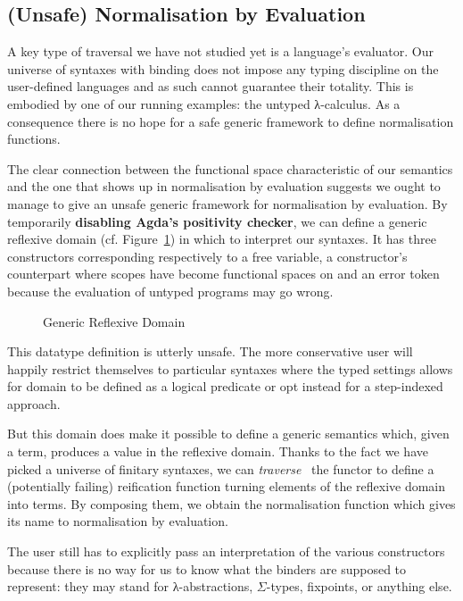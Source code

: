 \subsection{(Unsafe) Normalisation by Evaluation}\label{section:nbyeval}

A key type of traversal we have not studied yet is a language's
evaluator. Our universe of syntaxes with binding does not impose
any typing discipline on the user-defined languages and as such
cannot guarantee their totality. This is embodied by one of our running
examples: the untyped λ-calculus. As a consequence there
is no hope for a safe generic framework to define normalisation
functions.

The clear connection between the  functional space
characteristic of our semantics and the one that shows up in
normalisation by evaluation suggests we ought to manage to
give an unsafe generic framework for normalisation by evaluation.
By temporarily \textbf{disabling Agda's positivity checker},
we can define a generic reflexive domain 
(cf. Figure~\ref{fig:reflexivedomain}) in which to
interpret our syntaxes. It has three constructors corresponding
respectively to a free variable, a constructor's counterpart where
scopes have become  functional spaces on  and
an error token because the evaluation of untyped programs may go wrong.

\begin{figure}[h]
\caption{Generic Reflexive Domain}\label{fig:reflexivedomain}
\end{figure}

This datatype definition is utterly unsafe. The more conservative
user will happily restrict themselves to particular syntaxes where
the typed settings allows for domain to be defined as a logical
predicate or opt instead for a step-indexed approach.

But this domain does make it possible to define a generic 
semantics which, given a term, produces a value in the reflexive
domain. Thanks to the fact we have picked a universe of finitary syntaxes, we
can \emph{traverse}~\cite{mcbride_paterson_2008,DBLP:journals/jfp/GibbonsO09}
the functor to define
a (potentially failing) reification function turning elements of the
reflexive domain into terms. By composing them, we obtain the
normalisation function which gives its name to normalisation by
evaluation.

The user still has to explicitly pass an interpretation of
the various constructors because there is no way for us to
know what the binders are supposed to represent: they may
stand for λ-abstractions, $\Sigma$-types, fixpoints, or
anything else.


